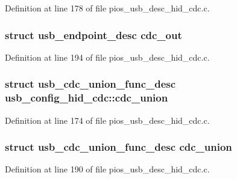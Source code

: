 Definition at line 178 of file pios\-\_\-usb\-\_\-desc\-\_\-hid\-\_\-cdc.\-c.

\hypertarget{group___p_i_o_s___u_s_b___d_e_s_c_ga9c39f39e6301c0d93317b2027a769a5a}{
\subsubsection[{cdc\-\_\-out}]{\setlength{\rightskip}{0pt plus 5cm}struct {\bf usb\-\_\-endpoint\-\_\-desc} cdc\-\_\-out}}\label{group___p_i_o_s___u_s_b___d_e_s_c_ga9c39f39e6301c0d93317b2027a769a5a}


Definition at line 194 of file pios\-\_\-usb\-\_\-desc\-\_\-hid\-\_\-cdc.\-c.

\hypertarget{group___p_i_o_s___u_s_b___d_e_s_c_gafdccd743e5f58edeace549e15f512d44}{
\subsubsection[{cdc\-\_\-union}]{\setlength{\rightskip}{0pt plus 5cm}struct {\bf usb\-\_\-cdc\-\_\-union\-\_\-func\-\_\-desc} usb\-\_\-config\-\_\-hid\-\_\-cdc\-::cdc\-\_\-union}}\label{group___p_i_o_s___u_s_b___d_e_s_c_gafdccd743e5f58edeace549e15f512d44}


Definition at line 174 of file pios\-\_\-usb\-\_\-desc\-\_\-hid\-\_\-cdc.\-c.

\hypertarget{group___p_i_o_s___u_s_b___d_e_s_c_ga18f1bcfd867862a7b68cf2307ff2df6d}{
\subsubsection[{cdc\-\_\-union}]{\setlength{\rightskip}{0pt plus 5cm}struct {\bf usb\-\_\-cdc\-\_\-union\-\_\-func\-\_\-desc} cdc\-\_\-union}}\label{group___p_i_o_s___u_s_b___d_e_s_c_ga18f1bcfd867862a7b68cf2307ff2df6d}


Definition at line 190 of file pios\-\_\-usb\-\_\-desc\-\_\-hid\-\_\-cdc.\-c.

